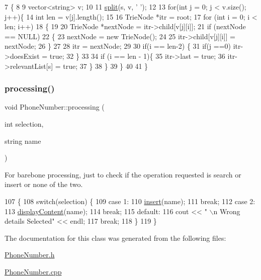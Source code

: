 \begin{DoxyCode}
7 \{
8 
9     vector<string> v;
10 
11     \hyperlink{utilities_8h_a80afb9a0ecee7cfa669f93e60d398559}{split}(s, v, \textcolor{charliteral}{' '});
12 
13     \textcolor{keywordflow}{for}(\textcolor{keywordtype}{int} j = 0;  j < v.size(); j++)\{
14         \textcolor{keywordtype}{int} len = v[j].length();
15  
16         TrieNode *itr = root;
17         \textcolor{keywordflow}{for} (\textcolor{keywordtype}{int} i = 0; i < len; i++)
18         \{
19 
20             TrieNode *nextNode = itr->child[v[j][i]];
21             \textcolor{keywordflow}{if} (nextNode == NULL)
22             \{
23                 nextNode = \textcolor{keyword}{new} TrieNode();
24      
25                 itr->child[v[j][i]] = nextNode;
26             \}
27      
28             itr = nextNode;
29 
30             \textcolor{keywordflow}{if}(i == len-2) \{
31                 \textcolor{keywordflow}{if}(j ==0) itr->doesExist = \textcolor{keyword}{true};
32             \}
33 
34             \textcolor{keywordflow}{if} (i == len - 1)\{
35                 itr->last = \textcolor{keyword}{true};
36                 itr->relevantList[s] = \textcolor{keyword}{true};
37             \}
38         \}
39     \}
40 
41 \}
\end{DoxyCode}
\mbox{\label{class_phone_number_a61de2e13f110953bad6af57895c860d2}} 
\subsubsection{\texorpdfstring{processing()}{processing()}}
{\footnotesize\ttfamily void Phone\+Number\+::processing (\begin{DoxyParamCaption}\item[{int}]{selection,  }\item[{string}]{name }\end{DoxyParamCaption})}



For barebone processing, just to check if the operation requested is search or insert or none of the two. 


\begin{DoxyCode}
107                                                        \{
108     \textcolor{keywordflow}{switch}(selection) \{
109         \textcolor{keywordflow}{case} 1: 
110                 \hyperlink{class_phone_number_a2a9b999ad972df12db343245c95bab1b}{insert}(name);
111                 \textcolor{keywordflow}{break};
112         \textcolor{keywordflow}{case} 2:
113                 \hyperlink{class_phone_number_a4e8abfb7ecb3e046a3bbbb4e5bdd3f64}{displayContent}(name);
114                 \textcolor{keywordflow}{break};
115         \textcolor{keywordflow}{default}:
116                 cout << \textcolor{stringliteral}{" \(\backslash\)n Wrong details Selected"} << endl;
117                 \textcolor{keywordflow}{break};
118     \}
119 \}
\end{DoxyCode}


The documentation for this class was generated from the following files\+:\begin{DoxyCompactItemize}
\item 
\hyperlink{_phone_number_8h}{Phone\+Number.\+h}\item 
\hyperlink{_phone_number_8cpp}{Phone\+Number.\+cpp}\end{DoxyCompactItemize}
